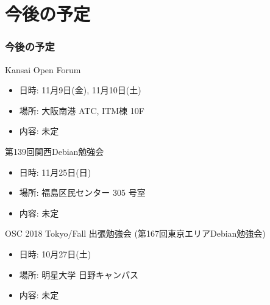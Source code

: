 \documentclass[cjk,dvipdfmx,10pt,compress,%
hyperref={bookmarks=true,bookmarksnumbered=true,bookmarksopen=false,%
colorlinks=false,%
pdftitle={第 132 回 関西 Debian 勉強会},%
pdfauthor={かわだ},%
pdfsubject={資料},%
}]{beamer}
\begin{document}
\section{今後の予定}
\begin{frame}[fragile]
  \frametitle{今後の予定}

  \begin{block}{Kansai Open Forum}
    \begin{itemize}
    \item 日時: 11月9日(金), 11月10日(土)
    \item 場所: 大阪南港 ATC, ITM棟 10F
    \item 内容: 未定
    \end{itemize}
  \end{block}

  \begin{block}{第139回関西Debian勉強会}
    \begin{itemize}
    \item 日時: 11月25日(日)
    \item 場所: 福島区民センター 305 号室
    \item 内容: 未定
    \end{itemize}
  \end{block}

  \begin{block}{OSC 2018 Tokyo/Fall 出張勉強会 (第167回東京エリアDebian勉強会)}
    \begin{itemize}
    \item 日時: 10月27日(土)
    \item 場所: 明星大学 日野キャンパス
    \item 内容: 未定 
    \end{itemize}
  \end{block}

\end{frame}

\takahashi[50]{  }
\end{document}
